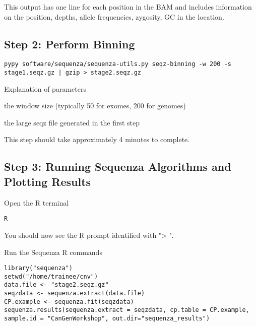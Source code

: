 This output has one line for each position in the BAM and includes information on the position, depths, allele frequencies, zygosity, GC in the location. 


\subsection{Step 2: Perform Binning}

\begin{steps}
\begin{lstlisting}
pypy software/sequenza/sequenza-utils.py seqz-binning -w 200 -s stage1.seqz.gz | gzip > stage2.seqz.gz
\end{lstlisting}
\end{steps}

\begin{note}
Explanation of parameters
\begin{description}[style=multiline,labelindent=0cm,align=right,leftmargin=\descriptionlabelspace,rightmargin=1.5cm,font=\ttfamily]
 \item[-w] the window size (typically 50 for exomes, 200 for genomes)
 \item[-s] the large seqz file generated in the first step
\end{description}
\end{note}

This step should take approximately 4 minutes to complete.


\subsection{Step 3: Running Sequenza Algorithms and Plotting Results}

\begin{steps}
Open the R terminal
\begin{lstlisting}
R
\end{lstlisting}
\end{steps}

You should now see the R prompt identified with "> ".

\begin{steps}
Run the Sequenza R commands
\begin{lstlisting}
library("sequenza")
setwd("/home/trainee/cnv")
data.file <- "stage2.seqz.gz"
seqzdata <- sequenza.extract(data.file)
CP.example <- sequenza.fit(seqzdata)
sequenza.results(sequenza.extract = seqzdata, cp.table = CP.example, sample.id = "CanGenWorkshop", out.dir="sequenza_results")
\end{lstlisting}
\end{steps}

